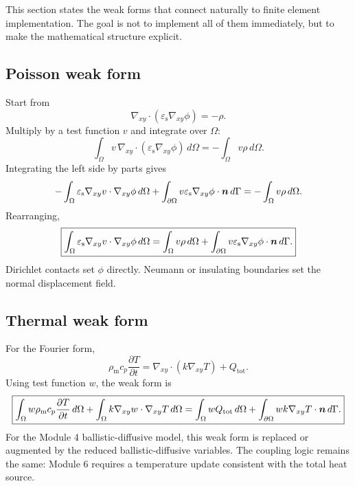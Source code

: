 \documentclass[11pt]{article}
\newcommand{\gradxy}{\nabla_{xy}}
\newcommand{\divxy}{\nabla_{xy}\cdot}
\newcommand{\OmegaD}{\Omega}
\newcommand{\epss}{\varepsilon_{\mathrm{s}}}
\newcommand{\rhom}{\rho_{\mathrm{m}}}
\newcommand{\cpsym}{c_{p}}
\begin{document}
This section states the weak forms that connect naturally to finite element implementation. The goal is not to implement all of them immediately, but to make the mathematical structure explicit.

\subsection{Poisson weak form}

Start from
\begin{equation}
\divxy(\epss\gradxy\phi)=-\rho.
\end{equation}
Multiply by a test function \(v\) and integrate over \(\OmegaD\):
\begin{equation}
\int_{\OmegaD} v\,\divxy(\epss\gradxy\phi)\,d\Omega
=
-
\int_{\OmegaD}v\rho\,d\Omega.
\end{equation}
Integrating the left side by parts gives
\begin{equation}
-
\int_{\OmegaD}\epss\gradxy v\cdot\gradxy\phi\,d\Omega
+
\int_{\partial\OmegaD}v\epss\gradxy\phi\cdot\nvec\,d\Gamma
=
-
\int_{\OmegaD}v\rho\,d\Omega.
\end{equation}
Rearranging,
\begin{equation}
\boxed{
\int_{\OmegaD}\epss\gradxy v\cdot\gradxy\phi\,d\Omega
=
\int_{\OmegaD}v\rho\,d\Omega
+
\int_{\partial\OmegaD}v\epss\gradxy\phi\cdot\nvec\,d\Gamma.}
\label{eq:weak_poisson}
\end{equation}
Dirichlet contacts set \(\phi\) directly. Neumann or insulating boundaries set the normal displacement field.

\subsection{Thermal weak form}

For the Fourier form,
\begin{equation}
\rhom\cpsym\frac{\partial T}{\partial t}=\divxy(k\gradxy T)+Q_{\mathrm{tot}}.
\end{equation}
Using test function \(w\), the weak form is
\begin{equation}
\boxed{
\int_{\OmegaD}w\rhom\cpsym\frac{\partial T}{\partial t}\,d\Omega
+
\int_{\OmegaD}k\gradxy w\cdot\gradxy T\,d\Omega
=
\int_{\OmegaD}wQ_{\mathrm{tot}}\,d\Omega
+
\int_{\partial\OmegaD}wk\gradxy T\cdot\nvec\,d\Gamma.}
\label{eq:weak_thermal}
\end{equation}
For the Module 4 ballistic-diffusive model, this weak form is replaced or augmented by the reduced ballistic-diffusive variables. The coupling logic remains the same: Module 6 requires a temperature update consistent with the total heat source.
\end{document}
